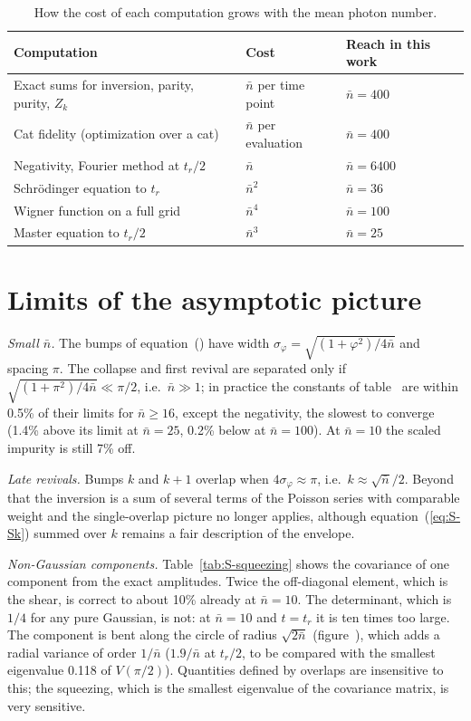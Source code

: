 \documentclass{iopjournal}
\newcommand{\nbar}{\bar{n}}
\begin{document}
\begin{table}
\centering
\caption{How the cost of each computation grows with the mean photon number.}
\begin{tabular}{lll}
\hline
Computation & Cost & Reach in this work \\
\hline
Exact sums for inversion, parity, purity, $Z_k$ & $\nbar$ per time point & $\nbar = 400$ \\
Cat fidelity (optimization over a cat) & $\nbar$ per evaluation & $\nbar = 400$ \\
Negativity, Fourier method at $t_r/2$ & $\nbar$ & $\nbar = 6400$ \\
Schr\"{o}dinger equation to $t_r$ & $\nbar^2$ & $\nbar = 36$ \\
Wigner function on a full grid & $\nbar^4$ & $\nbar = 100$ \\
Master equation to $t_r/2$ & $\nbar^3$ & $\nbar = 25$ \\
\hline
\end{tabular}
\label{tab:S-cost}
\end{table}

\section{Limits of the asymptotic picture}

\textit{Small $\nbar$.} The bumps of equation~() have width $\sigma_\varphi = \sqrt{(1+\varphi^2)/4\nbar}$ and spacing $\pi$. The collapse and first revival are separated only if $\sqrt{(1+\pi^2)/4\nbar}\ll\pi/2$, i.e.\ $\nbar\gg1$; in practice the constants of table~ are within 0.5\% of their limits for $\nbar\geq16$, except the negativity, the slowest to converge (1.4\% above its limit at $\nbar = 25$, 0.2\% below at $\nbar = 100$). At $\nbar = 10$ the scaled impurity is still 7\% off.

\textit{Late revivals.} Bumps $k$ and $k+1$ overlap when $4\sigma_\varphi\approx\pi$, i.e.\ $k\approx\sqrt{\nbar}/2$. Beyond that the inversion is a sum of several terms of the Poisson series with comparable weight and the single-overlap picture no longer applies, although equation~(\ref{eq:S-Sk}) summed over $k$ remains a fair description of the envelope.

\textit{Non-Gaussian components.} Table~\ref{tab:S-squeezing} shows the covariance of one component from the exact amplitudes. Twice the off-diagonal element, which is the shear, is correct to about 10\% already at $\nbar = 10$. The determinant, which is $1/4$ for any pure Gaussian, is not: at $\nbar = 10$ and $t = t_r$ it is ten times too large. The component is bent along the circle of radius $\sqrt{2\nbar}$ (figure~), which adds a radial variance of order $1/\nbar$ ($1.9/\nbar$ at $t_r/2$, to be compared with the smallest eigenvalue 0.118 of $V(\pi/2)$). Quantities defined by overlaps are insensitive to this; the squeezing, which is the smallest eigenvalue of the covariance matrix, is very sensitive.
\end{document}
